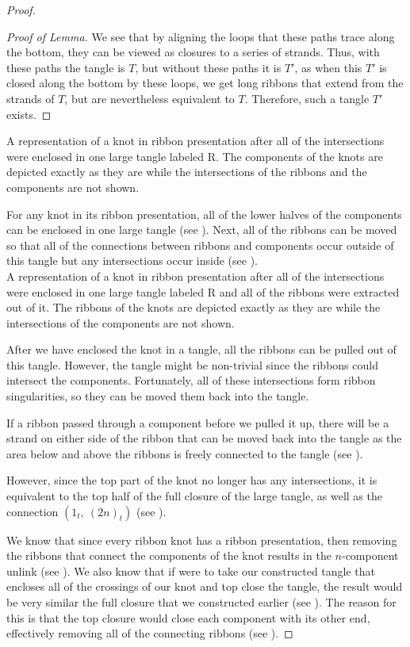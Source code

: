 \begin{paper}
\begin{proof}
\begin{proof}[Proof of Lemma]
We see that by aligning the loops that these paths trace along the bottom,
they can be viewed as closures to a series of strands.
Thus, with these paths the tangle is $T$, but without these paths it is $T'$,
as when this $T'$ is closed along the bottom by these loops, we get long ribbons
that extend from the strands of $T$, but are nevertheless equivalent to $T$.
Therefore, such a tangle $T'$ exists.
\end{proof}

{A representation of a knot in ribbon presentation after all of the
intersections were enclosed in one large tangle labeled R.
The components of the knots are depicted exactly as they are while the
intersections of the ribbons and the components are not shown.}

For any knot in its ribbon presentation, all of the lower halves of the
components can be enclosed in one large tangle (see \figPresentation).
Next, all of the ribbons can be moved so that all of the connections between
ribbons and components occur outside of this tangle but any intersections occur
inside (see \figLowered).\\

{A representation of a knot in ribbon presentation after all of the
intersections were enclosed in one large tangle labeled R and all of the ribbons
were extracted out of it.
The ribbons of the knots are depicted exactly as they are while the
intersections of the components are not shown.}

After we have enclosed the knot in a tangle, all the ribbons can be pulled out
of this tangle.
However, the tangle might be non-trivial since the ribbons could intersect the
components.
Fortunately, all of these intersections form ribbon singularities, so they can
be moved them back into the tangle.

If a ribbon passed through a component before we pulled it up, there will be a
strand on either side of the ribbon that can be moved back into the tangle as
the area below and above the ribbons is freely connected to the tangle (see
\figTwisted).

However, since the top part of the knot no longer has any intersections, it is
equivalent to the top half of the full closure of the large tangle, as well as
the connection $(1_t,~(2n)_t)$ (see \figFull).

We know that since every ribbon knot has a ribbon presentation, then removing
the ribbons that connect the components of the knot results in the $n$-component
unlink (see \figPresentation).
We also know that if were to take our constructed tangle that encloses all of
the crossings of our knot and top close the tangle, the result would be very
similar the full closure that we constructed earlier (see \figTop).
The reason for this is that the top closure would close each component with its
other end, effectively removing all of the connecting ribbons (see \figTwisted).


\end{proof}
\end{paper}
